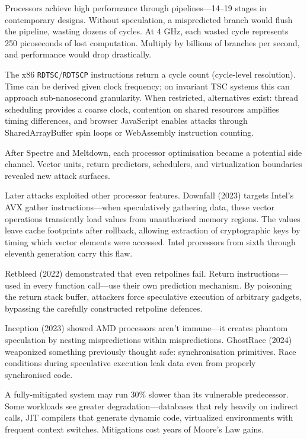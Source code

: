 Processors achieve high performance through pipelines—14–19 stages in contemporary designs. Without speculation, a mispredicted branch would flush the pipeline, wasting dozens of cycles. At 4 GHz, each wasted cycle represents 250 picoseconds of lost computation. Multiply by billions of branches per second, and performance would drop drastically.

The x86 \texttt{RDTSC}/\texttt{RDTSCP} instructions return a cycle count (cycle-level resolution). Time can be derived given clock frequency; on invariant TSC systems this can approach sub-nanosecond granularity. When restricted, alternatives exist: thread scheduling provides a coarse clock, contention on shared resources amplifies timing differences, and browser JavaScript enables attacks through SharedArrayBuffer spin loops or WebAssembly instruction counting.

After Spectre and Meltdown, each processor optimisation became a potential side channel. Vector units, return predictors, schedulers, and virtualization boundaries revealed new attack surfaces.

Later attacks exploited other processor features. Downfall (2023) targets Intel's AVX gather instructions—when speculatively gathering data, these vector operations transiently load values from unauthorised memory regions. The values leave cache footprints after rollback, allowing extraction of cryptographic keys by timing which vector elements were accessed. Intel processors from sixth through eleventh generation carry this flaw.

Retbleed (2022) demonstrated that even retpolines fail. Return instructions—used in every function call—use their own prediction mechanism. By poisoning the return stack buffer, attackers force speculative execution of arbitrary gadgets, bypassing the carefully constructed retpoline defences.

Inception (2023) showed AMD processors aren't immune—it creates \QSOpen{}phantom speculation\QSClose{} by nesting mispredictions within mispredictions. GhostRace (2024) weaponized something previously thought safe: synchronisation primitives. Race conditions during speculative execution leak data even from properly synchronised code.

A fully-mitigated system may run 30\% slower than its vulnerable predecessor. Some workloads see greater degradation—databases that rely heavily on indirect calls, JIT compilers that generate dynamic code, virtualized environments with frequent context switches. Mitigations cost years of Moore's Law gains.


